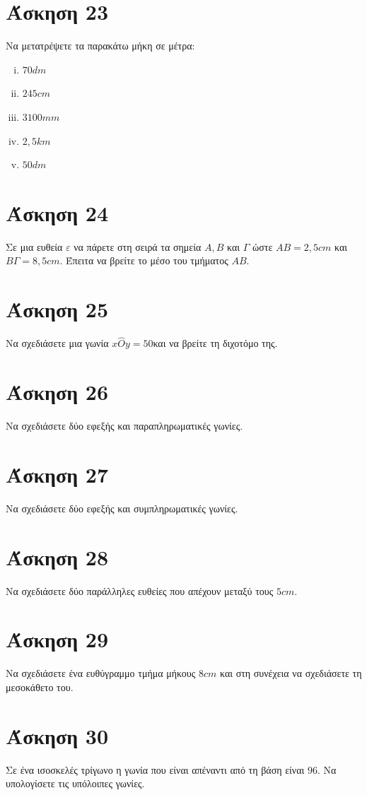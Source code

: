 \documentclass[a4paper,10pt]{report}
\begin{document}
\section*{Άσκηση 23  \hfill \small{}}
Να μετατρέψετε τα παρακάτω μήκη σε μέτρα:
\begin{enumerate}[i)]
 \item $70dm$
 \item $245cm$
 \item $3100mm$
 \item $2,5km$
 \item $50dm$
\end{enumerate}

\section*{Άσκηση 24  \hfill \small{}}
Σε μια ευθεία $ε$ να πάρετε στη σειρά τα σημεία $Α,Β$ και $Γ$ ώστε $ΑΒ=2,5cm$ και $ΒΓ=8,5cm$. Έπειτα να 
βρείτε το μέσο του τμήματος $ΑΒ$.

\section*{Άσκηση 25  \hfill \small{}}
Να σχεδιάσετε μια γωνία $x\hat{O}y=50$\textdegree και να βρείτε τη διχοτόμο της.

\section*{Άσκηση 26  \hfill \small{}}
Να σχεδιάσετε δύο εφεξής και παραπληρωματικές γωνίες.

\section*{Άσκηση 27  \hfill \small{}}
Να σχεδιάσετε δύο εφεξής και συμπληρωματικές γωνίες.

\section*{Άσκηση 28  \hfill \small{}}
Να σχεδιάσετε δύο παράλληλες ευθείες που απέχουν μεταξύ τους $5cm$.

\section*{Άσκηση 29  \hfill \small{}}
Να σχεδιάσετε ένα ευθύγραμμο τμήμα μήκους $8cm$ και στη συνέχεια να σχεδιάσετε τη μεσοκάθετο του.

\section*{Άσκηση 30  \hfill \small{}}
Σε ένα ισοσκελές τρίγωνο η γωνία που είναι απέναντι από τη βάση είναι $96$\textdegree. Να υπολογίσετε τις υπόλοιπες 
γωνίες.

\end{document}
